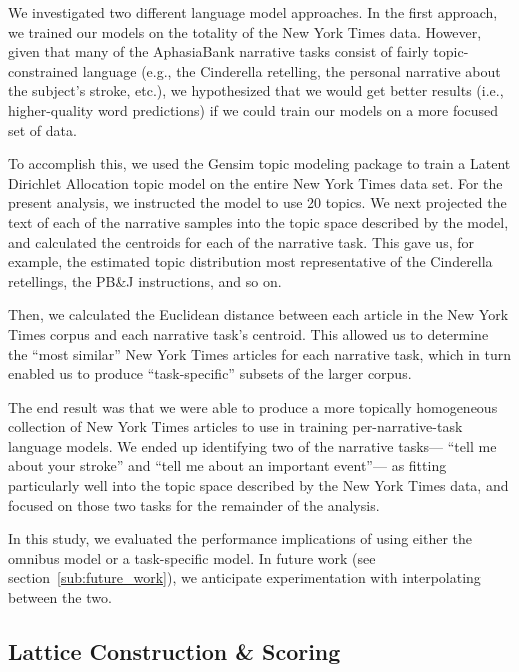\documentclass[11pt,letterpaper]{article}
\begin{document}
We investigated two different language model approaches.
In the first approach, we trained our models on the totality of the New York Times data.
However, given that many of the AphasiaBank narrative tasks consist of fairly topic-constrained language (e.g., the Cinderella retelling, the personal narrative about the subject's stroke, etc.), we hypothesized that we would get better results (i.e., higher-quality word predictions) if we could train our models on a more focused set of data.

To accomplish this, we used the Gensim topic modeling package \cite{rehurek_lrec} to train a Latent Dirichlet Allocation topic model \cite{Blei:2003:LDA:944919.944937} on the entire New York Times data set.
For the present analysis, we instructed the model to use 20 topics.
We next projected the text of each of the narrative samples into the topic space described by the model, and calculated the centroids for each of the narrative task.
This gave us, for example, the estimated topic distribution most representative of the Cinderella retellings, the PB\&J instructions, and so on.

Then, we calculated the Euclidean distance between each article in the New York Times corpus and each narrative task's centroid.
This allowed us to determine the ``most similar'' New York Times articles for each narrative task, which in turn enabled us to produce ``task-specific'' subsets of the larger corpus.

The end result was that we were able to produce a more topically homogeneous collection of New York Times articles to use in training per-narrative-task language models.
We ended up identifying two of the narrative tasks--- ``tell me about your stroke'' and ``tell me about an important event''--- as fitting particularly well into the topic space described by the New York Times data, and focused on those two tasks for the remainder of the analysis.


In this study, we evaluated the performance implications of using either the omnibus model or a task-specific model.
In future work (see section~\ref{sub:future_work}), we anticipate experimentation with interpolating between the two.

\subsection{Lattice Construction \& Scoring} %
\label{sub:lattice_construction_scoring}
\end{document}
